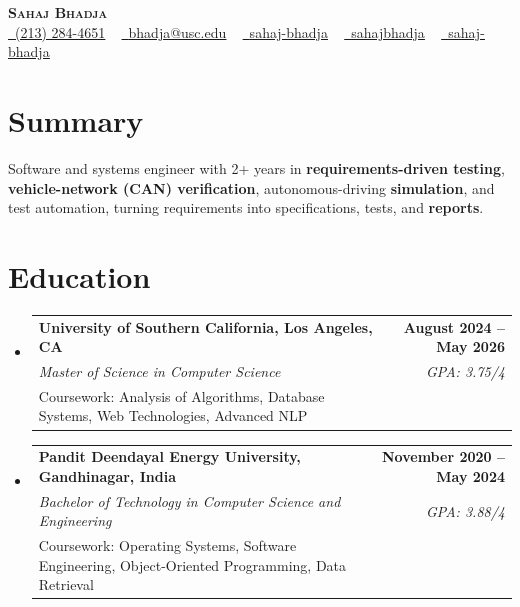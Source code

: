 \documentclass[letterpaper,10pt]{article}
\makeatletter
\newcommand{\sectionGap}{\vspace{-8pt}}
\newcommand{\resumeEduSubheading}[5]{\vspace{-1pt}\item\begin{tabular*}{1.0\textwidth}[t]{l@{\extracolsep{\fill}}r}\textbf{#1} & \textbf{\small #2} \\\textit{\small #3} & \textit{\small #4} \\\small #5 & \\\end{tabular*}\vspace{-4pt}}
\newcommand{\resumeSubHeadingListStart}{\begin{itemize}[leftmargin=0.0in, label={}]}
\newcommand{\resumeSubHeadingListEnd}{\end{itemize}}
\makeatother
\begin{document}
\begin{center}
{\Huge \scshape \textbf{Sahaj Bhadja}} \\ \vspace{1pt}
\small \href{tel:2132844651}{\faPhone\ \underline{(213) 284-4651}} ~ \href{mailto:bhadja@usc.edu}{\raisebox{-0.2\height}\faEnvelope\ \underline{bhadja@usc.edu}} ~
\href{https://www.linkedin.com/in/sahaj-bhadja/}{\raisebox{-0.2\height}\faLinkedin\ \underline{sahaj-bhadja}} ~ \href{https://github.com/SAHAJ-BHADJA}{\raisebox{-0.2\height}\faGithub\ \underline{sahajbhadja}} ~
\href{https://sahaj-bhadja.vercel.app/}{\raisebox{-0.2\height}\faGlobe\ \underline{sahaj-bhadja}}
\end{center}
\vspace{-16pt}
\section{Summary}
\begin{itemize}[leftmargin=0.15in, label={}]
\small{\item{Software and systems engineer with 2+ years in \textbf{requirements-driven testing}, \textbf{vehicle-network (CAN) verification}, autonomous-driving \textbf{simulation}, and test automation, turning requirements into specifications, tests, and \textbf{reports}.}}
\end{itemize}
\sectionGap
\section{Education}
\resumeSubHeadingListStart
\resumeEduSubheading{University of Southern California, Los Angeles, CA}{August 2024 -- May 2026}{Master of Science in Computer Science}{GPA: 3.75/4}{Coursework: Analysis of Algorithms, Database Systems, Web Technologies, Advanced NLP}
\resumeEduSubheading{Pandit Deendayal Energy University, Gandhinagar, India}{November 2020 -- May 2024}{Bachelor of Technology in Computer Science and Engineering}{GPA: 3.88/4}{Coursework: Operating Systems, Software Engineering, Object-Oriented Programming, Data Retrieval}
\resumeSubHeadingListEnd
\sectionGap
\end{document}
